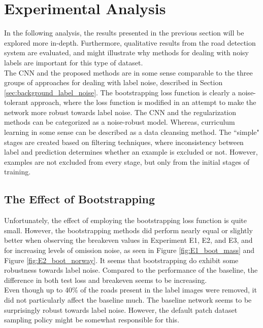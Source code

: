 \section{Experimental Analysis}
\label{sec:Discussion}
In the following analysis, the results presented in the previous section will be explored more in-depth. Furthermore, qualitative results from the road detection system are evaluated, and might illustrate why methods for dealing with noisy labels are important for this type of dataset.\\

The \ac{CNN} and the proposed methods are in some sense comparable to the three groups of approaches for dealing with label noise, described in Section \ref{sec:background_label_noise}. The bootstrapping loss function is clearly a noise-tolerant approach, where the loss function is modified in an attempt to make the network more robust towards label noise. The \ac{CNN} and the regularization methods can be categorized as a noise-robust model. Whereas, curriculum learning in some sense can be described as a data cleansing method. The ``simple" stages are created based on filtering techniques, where inconsistency between label and prediction determines whether an example is excluded or not. However, examples are not excluded from every stage, but only from the initial stages of training.\\

\subsection{The Effect of Bootstrapping}
Unfortunately, the effect of employing the bootstrapping loss function is quite small. However, the bootstrapping methods did perform nearly equal or slightly better when observing the breakeven values in Experiment E1, E2, and E3, and for increasing levels of omission noise,  as seen in Figure \ref{fig:E1_boot_mass} and Figure \ref{fig:E2_boot_norway}. It seems that bootstrapping do exhibit some robustness towards label noise. Compared to the performance of the baseline, the difference in both test loss and breakeven seems to be increasing.  \\

Even though up to 40\% of the roads present in the label images were removed, it did not particularly affect the baseline much. The baseline network seems to be surprisingly robust towards label noise. However, the default patch dataset sampling policy might be somewhat responsible for this.\\

